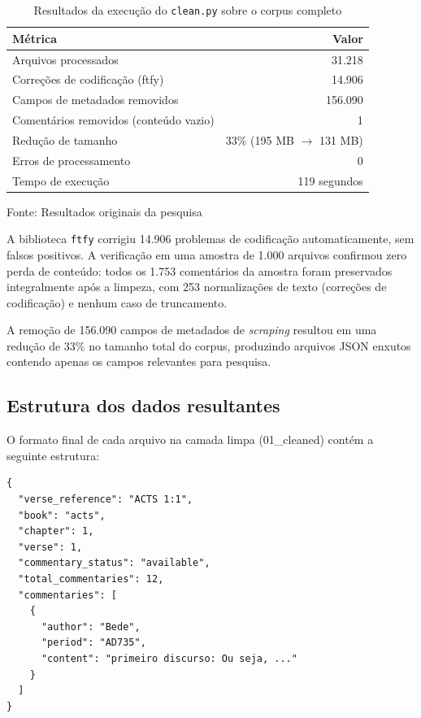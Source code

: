 \documentclass[11pt,a4paper]{article}
\begin{document}
\begin{table}[H]
\centering
\caption{Resultados da execu\c{c}\~{a}o do \texttt{clean.py} sobre o corpus completo}
\label{tab:cleaning}
\begin{tabularx}{0.75\textwidth}{Xr}
\toprule
M\'{e}trica & Valor \\
\midrule
Arquivos processados & 31.218 \\
Corre\c{c}\~{o}es de codifica\c{c}\~{a}o (ftfy) & 14.906 \\
Campos de metadados removidos & 156.090 \\
Coment\'{a}rios removidos (conte\'{u}do vazio) & 1 \\
Redu\c{c}\~{a}o de tamanho & 33\% (195 MB $\rightarrow$ 131 MB) \\
Erros de processamento & 0 \\
Tempo de execu\c{c}\~{a}o & 119 segundos \\
\bottomrule
\end{tabularx}

Fonte: Resultados originais da pesquisa
\end{table}

A biblioteca \texttt{ftfy} corrigiu 14.906 problemas de codifica\c{c}\~{a}o automaticamente, sem falsos positivos. A verifica\c{c}\~{a}o em uma amostra de 1.000 arquivos confirmou zero perda de conte\'{u}do: todos os 1.753 coment\'{a}rios da amostra foram preservados integralmente ap\'{o}s a limpeza, com 253 normaliza\c{c}\~{o}es de texto (corre\c{c}\~{o}es de codifica\c{c}\~{a}o) e nenhum caso de truncamento.

A remo\c{c}\~{a}o de 156.090 campos de metadados de \textit{scraping} resultou em uma redu\c{c}\~{a}o de 33\% no tamanho total do corpus, produzindo arquivos JSON enxutos contendo apenas os campos relevantes para pesquisa.

\subsection{Estrutura dos dados resultantes}

O formato final de cada arquivo na camada limpa (01\_cleaned) cont\'{e}m a seguinte estrutura:

\begin{lstlisting}[style=json]
{
  "verse_reference": "ACTS 1:1",
  "book": "acts",
  "chapter": 1,
  "verse": 1,
  "commentary_status": "available",
  "total_commentaries": 12,
  "commentaries": [
    {
      "author": "Bede",
      "period": "AD735",
      "content": "primeiro discurso: Ou seja, ..."
    }
  ]
}
\end{lstlisting}
\end{document}
